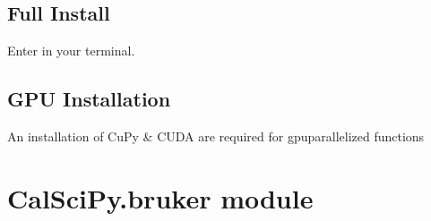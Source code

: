 \documentclass[letterpaper,10pt,english]{sphinxmanual}
\begin{document}
\section{Full Install}
\label{\detokenize{Installation:full-install}}
\sphinxAtStartPar
Enter  in your terminal.


\section{GPU Installation}
\label{\detokenize{Installation:gpu-installation}}
\sphinxAtStartPar
An installation of CuPy \& CUDA are required for gpu\sphinxhyphen{}parallelized functions

\sphinxstepscope


\chapter{CalSciPy.bruker module}
\label{\detokenize{CalSciPy.bruker:module-CalSciPy.bruker}}\label{\detokenize{CalSciPy.bruker:calscipy-bruker-module}}\label{\detokenize{CalSciPy.bruker::doc}}
\end{document}
